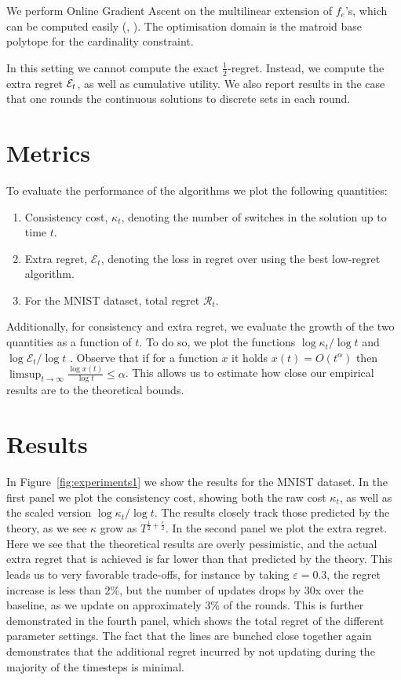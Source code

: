 We perform Online Gradient Ascent on the multilinear extension of $f_e$'s, which can be computed easily (\cf, \citet[Appendix E.2]{Karimi2017}). The optimisation domain is the matroid base polytope for the cardinality constraint.

In this setting we cannot compute the exact  $\frac{1}{2}$-regret. Instead, we compute the extra regret $\mathcal{E}_t$, as well as cumulative utility. We also report results in the case that one rounds the continuous solutions to discrete sets in each round. 

\section{Metrics}
To evaluate the performance of the algorithms we plot the following quantities:
\begin{enumerate}\itemsep=0in
\item Consistency cost, $\kappa_t$, denoting the number of switches in the solution up to time $t$. 
\item Extra regret, $\mathcal{E}_t$, denoting the loss in regret over using the best low-regret algorithm. 
\item For the MNIST dataset, total regret $\mathcal{R}_t$.
\end{enumerate}

Additionally, for consistency and extra regret, we evaluate the growth of the two quantities as a function of $t$. To do so, we plot the functions $\log \kappa_t / \log t$ and $\log \mathcal{E}_t / \log t$ . Observe that if for a function $x$ it holds $x(t) = O(t^{\alpha})$ then $\limsup_{t\to\infty} \frac{\log x(t)}{\log t} \leq \alpha$. This allows us to estimate how close our empirical results are to the theoretical bounds. 

\section{Results}
In Figure~\ref{fig:experiments1} we show the results for the MNIST dataset. In the first panel we plot the consistency cost, showing both the raw cost $\kappa_t$, as well as the scaled version $\log \kappa_t / \log t$. The results closely track those predicted by the theory, as we see $\kappa$ grow as $T^{\frac{1}{2} + \frac{\epsilon}{2}}$. In the second panel we plot the extra regret. Here we see that the theoretical results are overly pessimistic, and the actual extra regret that is achieved is far lower than that predicted by the theory. This leads us to very favorable trade-offs, for instance by taking $\varepsilon=0.3$, the regret increase is less than $2\%$, but the number of updates drops by $30$x over the baseline, as we update on approximately $3\%$ of the rounds. This is further demonstrated in the fourth panel, which shows the total regret of the different parameter settings. The fact that the lines are bunched close together again demonstrates that the additional regret incurred by not updating during the majority of the timesteps is minimal. 

